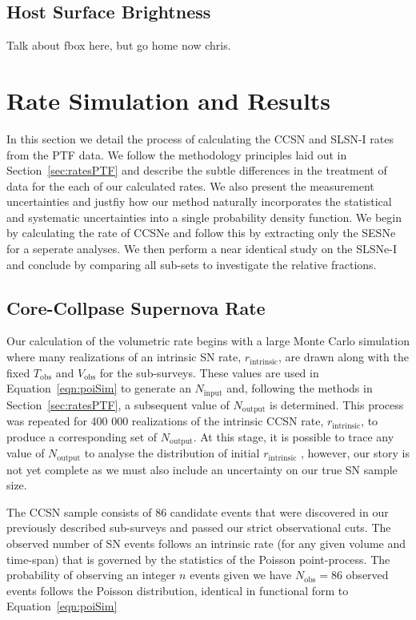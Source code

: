\documentclass[a4paper,fleqn,usenatbib]{mnras}
\begin{document}
\subsection{Host Surface Brightness}
\label{sec:fox_distribution}

Talk about fbox here, but go home now chris.


\section{Rate Simulation and Results}
\label{sec:rate_sim}

In this section we detail the process of calculating the CCSN and SLSN-I rates from the PTF data. We follow the methodology principles laid out in Section~\ref{sec:ratesPTF} and describe the subtle differences in the treatment of data for the each of our calculated rates. We also present the measurement uncertainties and justfiy how our method naturally incorporates the statistical and systematic uncertainties into a single probability density function. We begin by calculating the rate of CCSNe and follow this by extracting only the SESNe for a seperate analyses. We then perform a near identical study on the SLSNe-I and conclude by comparing all sub-sets to investigate the relative fractions.

\subsection{Core-Collpase Supernova Rate}
\label{sec:CCSN_Rate}

Our calculation of the volumetric rate begins with a large Monte Carlo simulation where many realizations of an intrinsic SN rate, $r_\mathrm{intrinsic}$, are drawn along with the fixed $T_\mathrm{obs}$ and $V_\mathrm{obs}$ for the sub-surveys. These values are used in Equation~\ref{eqn:poiSim} to generate an $N_\mathrm{input}$ and, following the methods in Section~\ref{sec:ratesPTF}, a subsequent value of $N_\mathrm{output}$ is determined. This process was repeated for 400 000 realizations of the intrinsic CCSN rate, $r_\mathrm{intrinsic}$, to produce a corresponding set of $N_\mathrm{output}$. At this stage, it is possible to trace any value of $N_\mathrm{output}$ to analyse the distribution of initial $r_\mathrm{intrinsic}$ \citep[e.g.][]{Prajs2016}, however, our story is not yet complete as we must also include an uncertainty on our true SN sample size.

The CCSN sample consists of 86 candidate events that were discovered in our previously described sub-surveys and passed our strict observational cuts. The observed number of SN events follows an intrinsic rate (for any given volume and time-span) that is governed by the statistics of the Poisson point-process. The probability of observing an integer $n$ events given we have $N_\mathrm{obs}=86$ observed events follows the Poisson distribution, identical in functional form to Equation~\ref{eqn:poiSim} 
\end{document}
